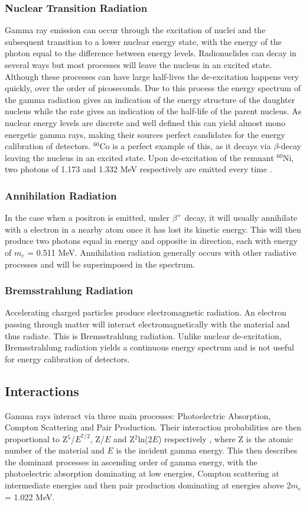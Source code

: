 \subsubsection{Nuclear Transition Radiation}
Gamma ray emission can occur through the excitation of nuclei and the subsequent transition to a lower nuclear energy state, with the energy of the photon equal to the difference between energy levels. Radionuclides can decay in several ways but most processes will leave the nucleus in an excited state. Although these processes can have large half-lives the de-excitation happens very quickly, over the order of picoseconds. Due to this process the energy spectrum of the gamma radiation gives an indication of the energy structure of the daughter nucleus while the rate gives an indication of the half-life of the parent nucleus. As nuclear energy levels are discrete and well defined this can yield almost mono energetic gamma rays, making their sources perfect candidates for the energy calibration of detectors. $^{60}$Co is a perfect example of this, as it decays via  $\beta$-decay leaving the nucleus in an excited state. Upon de-excitation of the remnant $^{60}$Ni, two photons of 1.173 and 1.332 MeV respectively are emitted every time \cite{knollRadiation}.

\subsubsection{Annihilation Radiation}
In the case when a positron is emitted, under $\beta^{+}$ decay, it will usually annihilate with a  electron in a nearby atom once it has lost its kinetic energy. This will then produce two photons equal in energy and opposite in direction, each with energy of $m_{e}$ = 0.511 MeV. Annihilation radiation generally occurs with other radiative processes and will be superimposed in the spectrum.

\subsubsection{Bremsstrahlung Radiation}
Accelerating charged particles produce electromagnetic radiation. An electron passing through matter will interact electromagnetically with the material and thus radiate. This is Bremsstrahlung radiation. Unlike nuclear de-excitation, Bremsstrahlung radiation yields a continuous energy spectrum and is not useful for energy calibration of detectors. 

\subsection{Interactions}
Gamma rays interact via three main processes: Photoelectric Absorption, Compton Scattering and Pair Production. Their interaction probabilities are then proportional to Z$^{5}$/$E^{7/2}$, Z/$E$ and Z$^{2}$ln(2$E$) respectively \cite{nobleGasDetectors}, where Z is the atomic number of the material and $E$ is the incident gamma energy. This then describes the dominant processes in ascending order of gamma energy, with the photoelectric absorption dominating at low energies, Compton scattering at intermediate energies and then pair production dominating at energies above 2$m_{e}$ = 1.022 MeV.

